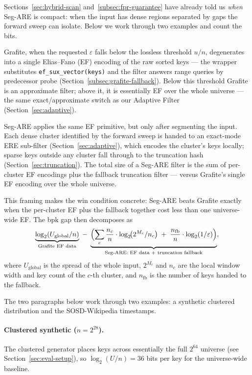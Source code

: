 Sections~\ref{sec:hybrid-scan} and~\ref{subsec:fpr-guarantee} have
already told us \emph{when} Seg-ARE is compact: when the input has
dense regions separated by gaps the forward sweep can isolate.
Below we work through two examples and count the bits.

Grafite, when the requested $\varepsilon$ falls below
the lossless threshold $u/n$, degenerates into a single Elias--Fano (EF) encoding of
the raw sorted keys --- the wrapper substitutes
\texttt{ef\_sux\_vector(keys)} and the filter answers range queries by
predecessor probe (Section~\ref{subsec:grafite-fallback}).
Below this threshold Grafite is an approximate filter; above it, it is
essentially EF over the whole universe --- the same exact/approximate
switch as our Adaptive Filter (Section~\ref{sec:adaptive}).

Seg-ARE applies the same EF primitive, but only after segmenting the
input.
Each dense cluster identified by the forward sweep is handed to
an exact-mode ERE sub-filter (Section~\ref{sec:adaptive}), which
encodes the cluster's keys locally; sparse keys outside any cluster
fall through to the truncation hash (Section~\ref{sec:truncation}).
The total size of a Seg-ARE filter is the sum of per-cluster EF
encodings plus the fallback truncation filter --- versus Grafite's
single EF encoding over the whole universe.

This framing makes the win condition concrete: Seg-ARE beats Grafite
exactly when the per-cluster EF plus the fallback together cost less
than one universe-wide EF.
The bpk gap then decomposes as
\[
    \underbrace{\log_2(U_{\text{global}}/n)}_{\text{Grafite EF data}}
    \;-\;
    \underbrace{\Bigl(\sum_{c} \frac{n_c}{n} \cdot
    \log_2\!\bigl(2^{M_c}/n_c\bigr) \;+\; \frac{n_{\text{fb}}}{n} \cdot
    \log_2(1/\varepsilon)\Bigr)}_{\text{Seg-ARE: EF data + truncation fallback}},
\]
where $U_{\text{global}}$ is the spread of the whole input, $2^{M_c}$
and $n_c$ are the local window width and key count of the $c$-th
cluster, and $n_{\text{fb}}$ is the number of keys handed to the
fallback.

The two paragraphs below work through two examples: a synthetic
clustered distribution and the SOSD-Wikipedia timestamps.

\paragraph{Clustered synthetic ($n = 2^{28}$).}
The clustered generator places keys across essentially the full
$2^{64}$ universe (see Section~\ref{sec:eval-setup}), so
$\log_2(U/n) = 36$ bits per key for the universe-wide baseline.

